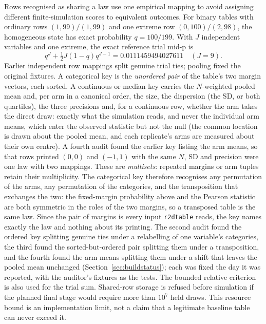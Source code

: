 \documentclass[11pt,a4paper]{article}
\begin{document}
Rows recognised as sharing a law use one empirical mapping to avoid assigning different finite-simulation scores to equivalent outcomes. For binary tables with ordinary rows $(1,99)/(1,99)$ and one extreme row $(0,100)/(2,98)$, the homogeneous state has exact probability $q=100/199$. With $J$ independent variables and one extreme, the exact reference trial mid-p is
\begin{equation}
q^J+\tfrac12J(1-q)q^{J-1}=0.0111459494027611\quad(J=9).
\end{equation}
Earlier independent row mappings split genuine trial ties; pooling fixed the original fixtures. A categorical key is the \emph{unordered pair} of the table's two margin vectors, each sorted. A continuous or median key carries the $N$-weighted pooled mean and, per arm in a canonical order, the size, the dispersion (the SD, or both quartiles), the three precisions and, for a continuous row, whether the arm takes the direct draw: exactly what the simulation reads, and never the individual arm means, which enter the observed statistic but not the null (the common location is drawn about the pooled mean, and each replicate's arms are measured about their own centre). A fourth audit found the earlier key listing the arm means, so that rows printed $(0,0)$ and $(-1,1)$ with the same $N$, SD and precision were one law with two mappings. These are \emph{multisets}: repeated margins or arm tuples retain their multiplicity. The categorical key therefore recognises any permutation of the arms, any permutation of the categories, and the transposition that exchanges the two: the fixed-margin probability above and the Pearson statistic are both symmetric in the roles of the two margins, so a transposed table is the same law. Since the pair of margins is every input \texttt{r2dtable} reads, the key names exactly the law and nothing about its printing. The second audit found the ordered key splitting genuine ties under a relabelling of one variable's categories, the third found the sorted-but-ordered pair splitting them under a transposition, and the fourth found the arm means splitting them under a shift that leaves the pooled mean unchanged (Section~\ref{sec:buildstatus}); each was fixed the day it was reported, with the auditor's fixtures as the tests. The bounded relative criterion is also used for the trial sum. Shared-row storage is refused before simulation if the planned final stage would require more than $10^7$ held draws. This resource bound is an implementation limit, not a claim that a legitimate baseline table can never exceed it.
\end{document}
